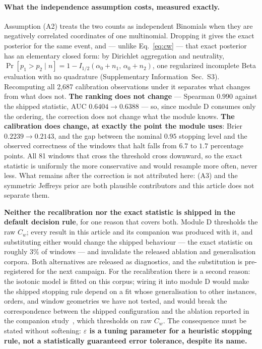 \documentclass[final,5p,times,longtitle]{elsarticle}
\newcommand{\SI}{Supplementary Information}
\newcommand{\SIdirichlet}{\SI{}~Sec.~S3}
\newcommand{\Cw}{C_w}
\begin{document}
\paragraph{What the independence assumption costs, measured exactly.}
Assumption (A2) treats the two counts as independent Binomials when they
are negatively correlated coordinates of one multinomial. Dropping it gives
the exact posterior for the same event, and --- unlike
Eq.~\eqref{eq:cw} --- that exact posterior has an elementary closed form:
by Dirichlet aggregation and neutrality,
$\Pr[p_1>p_2\mid n]=1-I_{1/2}(\alpha_0+n_1,\,\alpha_0+n_2)$, one
regularized incomplete Beta evaluation with no quadrature (\SIdirichlet{}).
Recomputing all 2{,}687 calibration observations under it separates what
changes from what does not. \textbf{The ranking does not change} ---
Spearman $0.990$ against the shipped statistic, AUC $0.6404\to0.6388$ ---
so, since module D consumes only the ordering, the correction does not
change what the module knows. \textbf{The calibration does change, at
exactly the point the module uses}: Brier $0.2239\to0.2143$, and the gap
between the nominal $0.95$ stopping level and the observed correctness of
the windows that halt falls from $6.7$ to $1.7$ percentage points. All 81
windows that cross the threshold cross downward, so the exact statistic is
uniformly the more conservative and would resample more often, never less.
What remains after the correction is not attributed here: (A3) and the
symmetric Jeffreys prior are both plausible contributors and this article
does not separate them.

\textbf{Neither the recalibration nor the exact statistic is shipped in the
default decision rule}, for one reason that covers both. Module D
thresholds the raw $\Cw$; every result in this article and its companion
was produced with it, and substituting either would change the shipped
behaviour --- the exact statistic on roughly $3\%$ of windows --- and
invalidate the released ablation and generalisation corpora. Both
alternatives are released as diagnostics, and the substitution is
pre-registered for the next campaign. For the recalibration there is a
second reason: the isotonic model is fitted on this corpus; wiring it into
module D would make the shipped stopping rule depend on a fit whose
generalisation to other instances, orders, and window geometries we have
not tested, and would
break the correspondence between the shipped configuration and the
ablation reported in the companion study~\cite{companion}, which
thresholds on raw
$\Cw$. The consequence must be stated without softening:
\textbf{$\varepsilon$ is a tuning parameter for a heuristic stopping
rule, not a statistically guaranteed error tolerance, despite its name.}
\end{document}
